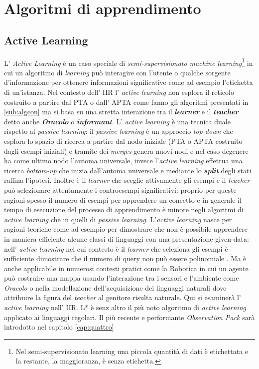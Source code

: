
\chapter[Algoritmi d'apprendimento]{Algoritmi di apprendimento} %
\label{cap:tre}
\section{Active Learning}
L' \textit{Active Learning} è un caso speciale di \textit{semi-supervisionato machine learning}\footnote{Nel semi-supervisionato learning una piccola quantità di dati è etichettata e la restante, la maggioranza, è senza etichetta.} in cui un algoritmo di \textit{learning} può interagire con l'utente o  qualche sorgente d'informazione per ottenere informazioni significative come ad esempio l'etichetta di un'istanza. Nel contesto dell' \ac{IIR} l' \textit{active learning} non esplora il reticolo costruito a partire dal PTA o dall' APTA come fanno gli algoritmi presentati in \ref{sub:algcon}  ma si basa su una stretta interazione tra il \textit{\textbf{learner}} e il \textit{\textbf{teacher}}  detto anche \textit{\textbf{Oracolo}} o \textit{\textbf{informant}}. L' \textit{active learning} è una tecnica duale rispetto al \textit{passive learning}: il \textit{passive learning} è un approccio \textit{top-down} che esplora lo spazio di ricerca a partire dal nodo iniziale (PTA o APTA costruito  dagli esempi iniziali) e tramite dei \textit{merges} genera nuovi nodi e nel caso degenere ha come ultimo nodo l'automa universale, invece l'\textit{active learning} effettua una ricerca \textit{bottom-up} che inizia dall'automa universale e mediante lo \textbf{\textit{split}} degli stati raffina l'ipotesi. Inoltre è il \textit{learner} che sceglie attivamente gli esempi e  il \textit{teacher} può selezionare attentamente i controesempi significativi: proprio per queste ragioni spesso il numero di esempi per apprendere un concetto e in generale il tempo di esecuzione del processo di apprendimento è minore negli algoritmi di \textit{active learning} che in quelli di \textit{passive learning}.   
L'\textit{active learning} nasce per ragioni teoriche come ad esempio per dimostrare che non è possibile apprendere in maniera efficiente alcune classi di linguaggi con una presentazione given-data: nell' \textit{active learning} nel cui contesto è il \textit{learner} che seleziona gli esempi  è sufficiente dimostrare che il numero di query non può essere polinomiale . Ma è anche applicabile in numerosi contesti pratici come la Robotica in cui un agente può costruire una mappa usando l'interazione tra i sensori e l'ambiente come \textit{Oracolo} o nella modellazione dell'acquisizione dei linguaggi naturali dove attribuire la figura del \textit{teacher} al genitore risulta naturale. Qui si esaminerà l' \textit{active learning} nell' \ac{IIR}. L* è senz altro il più noto algoritmo  di \textit{active learning} applicato ai linguaggi regolari. Il più recente e performante \textit{Observation Pack} sarà introdotto nel capitolo \ref{cap:quattro}
